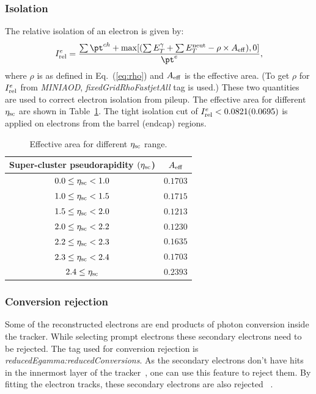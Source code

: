 \subsubsection{Isolation}
\label{s:ele_iso}
The relative isolation of an electron is given by:
\begin{equation}
\label{eq:ele_iso}
I_{\rm rel}^e= \frac{\sum\pt^{ch}+{\rm max}[(\sum E_T^\gamma+\sum E_T^{\rm neut}-\rho\times A_{\rm eff}),0]}{\pt^e},
\end{equation}
where $\rho$ is as defined in Eq.~(\ref{eq:rho}) and $A_{\rm eff}$ is the effective
area. (To get $\rho$ for $I_{\rm rel}^e$ from {\em MINIAOD}, {\em fixedGridRhoFastjetAll} tag is used.)
These two quantities are used to correct electron isolation from pileup.
The effective area for different $\eta_{\rm sc}$ are shown in Table~\ref{tab:EA}. The
tight isolation cut of $I_{\rm rel}^e < 0.0821 (0.0695)$ is applied on electrons from
the barrel (endcap) regions.
\begin{table}
 \caption{Effective area for different $\eta_{\rm sc}$ range.}
 \begin{center}
 \begin{tabular}{cc}\hline\hline
     Super-cluster pseudorapidity $(\eta_{\rm sc}$) & $A_{\rm eff}$ \\ \hline\hline
     $0.0 \leq \eta_{\rm sc} < 1.0 $ & $0.1703$ \\
     $1.0 \leq \eta_{\rm sc} < 1.5 $ & $0.1715$ \\
     $1.5 \leq \eta_{\rm sc} < 2.0 $ & $0.1213$ \\
     $2.0 \leq \eta_{\rm sc} < 2.2 $ & $0.1230$ \\
     $2.2 \leq \eta_{\rm sc} < 2.3 $ & $0.1635$ \\
     $2.3 \leq \eta_{\rm sc} < 2.4 $ & $0.1703$ \\
     $2.4 \leq \eta_{\rm sc} $ & $0.2393$ \\\hline
 \end{tabular}
 \end{center}
 \label{tab:EA}
 \end{table}

\subsubsection{Conversion rejection}
\label{s:ele_conv_rej}
Some of the reconstructed electrons are end products of photon conversion inside the tracker.
While selecting prompt electrons these secondary electrons need to be rejected.
The tag used for conversion rejection is {\em reducedEgamma:reducedConversions}.
As the secondary electrons don't have hits in the innermost layer of the tracker~\cite{Khachatryan:2015hwa},
one can use this feature to reject them.
By fitting the electron tracks, these secondary electrons are also rejected ~\cite{Khachatryan:2015hwa}.

